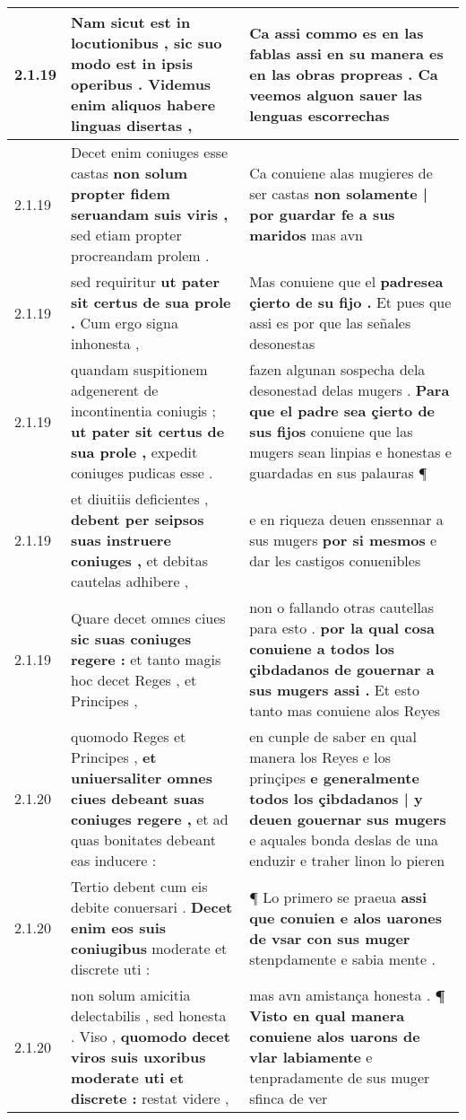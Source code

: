\begin{tabular}{|p{1cm}|p{6.5cm}|p{6.5cm}|}
2.1.19 & Nam sicut est in locutionibus , \textbf{ sic suo modo est in ipsis operibus . } Videmus enim aliquos habere linguas disertas , & Ca assi commo es en las fablas \textbf{ assi en su manera es en las obras propreas . } Ca veemos alguon sauer las lenguas escorrechas \\\hline
2.1.19 & Decet enim coniuges esse castas \textbf{ non solum propter fidem seruandam suis viris , } sed etiam propter procreandam prolem . & Ca conuiene alas mugieres de ser castas \textbf{ non solamente | por guardar fe a sus maridos } mas avn \\\hline
2.1.19 & sed requiritur \textbf{ ut pater sit certus de sua prole . } Cum ergo signa inhonesta , & Mas conuiene que el \textbf{ padresea çierto de su fijo . } Et pues que assi es por que las señales desonestas \\\hline
2.1.19 & quandam suspitionem adgenerent de incontinentia coniugis ; \textbf{ ut pater sit certus de sua prole , } expedit coniuges pudicas esse . & fazen algunan sospecha dela desonestad delas mugers . \textbf{ Para que el padre sea çierto de sus fijos } conuiene que las mugers sean linpias e honestas e guardadas en sus palauras ¶ \\\hline
2.1.19 & et diuitiis deficientes , \textbf{ debent per seipsos suas instruere coniuges , } et debitas cautelas adhibere , & e en riqueza deuen enssennar a sus mugers \textbf{ por si mesmos } e dar les castigos conuenibles \\\hline
2.1.19 & Quare decet omnes ciues \textbf{ sic suas coniuges regere : } et tanto magis hoc decet Reges , et Principes , & non o fallando otras cautellas para esto . \textbf{ por la qual cosa conuiene a todos los çibdadanos de gouernar a sus mugers assi . } Et esto tanto mas conuiene alos Reyes \\\hline
2.1.20 & quomodo Reges et Principes , \textbf{ et uniuersaliter omnes ciues debeant suas coniuges regere , } et ad quas bonitates debeant eas inducere : & en cunple de saber en qual manera los Reyes e los prinçipes \textbf{ e generalmente todos los çibdadanos | y deuen gouernar sus mugers } e aquales bonda deslas de una enduzir e traher linon lo pieren \\\hline
2.1.20 & Tertio debent cum eis debite conuersari . \textbf{ Decet enim eos suis coniugibus } moderate et discrete uti : & ¶ Lo primero se praeua \textbf{ assi que conuien e alos uarones de vsar con sus muger } stenpdamente e sabia mente . \\\hline
2.1.20 & non solum amicitia delectabilis , sed honesta . Viso , \textbf{ quomodo decet viros suis uxoribus moderate uti et discrete : } restat videre , & mas avn amistança honesta . \textbf{ ¶ Visto en qual manera conuiene alos uarons de vlar labiamente } e tenpradamente de sus muger sfinca de ver \\\hline

\end{tabular}
